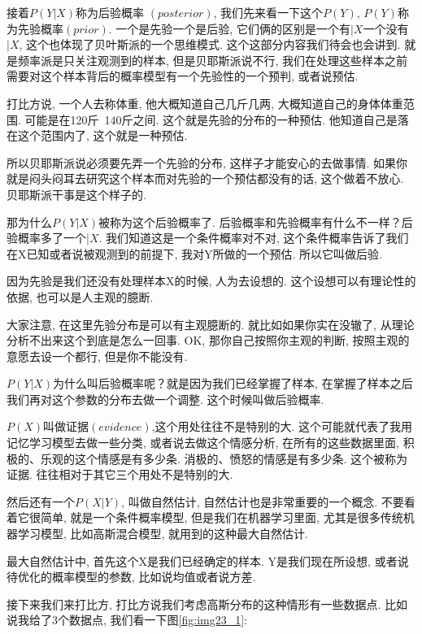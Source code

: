 接着$P(Y|X)$称为后验概率 $(\mathord{posterior})$, 我们先来看一下这个$P(Y)$, $P(Y)$称为先验概率$(\mathord{prior})$. 一个是先验一个是后验, 它们俩的区别是一个有$|X$一个没有$|X$, 这个也体现了贝叶斯派的一个思维模式. 这个这部分内容我们待会也会讲到. 就是频率派是只关注观测到的样本, 但是贝耶斯派说不行, 我们在处理这些样本之前需要对这个样本背后的概率模型有一个先验性的一个预判, 或者说预估. 

打比方说, 一个人去称体重, 他大概知道自己几斤几两, 大概知道自己的身体体重范围. 可能是在120斤~140斤之间. 这个就是先验的分布的一种预估. 他知道自己是落在这个范围内了, 这个就是一种预估. 

所以贝耶斯派说必须要先弄一个先验的分布, 这样子才能安心的去做事情. 如果你就是闷头闷耳去研究这个样本而对先验的一个预估都没有的话, 这个做着不放心. 贝耶斯派干事是这个样子的. 

那为什么$P(Y|X)$被称为这个后验概率了. 后验概率和先验概率有什么不一样？后验概率多了一个$|X$. 我们知道这是一个条件概率对不对, 这个条件概率告诉了我们在X已知或者说被观测到的前提下, 我对Y所做的一个预估. 所以它叫做后验. 

因为先验是我们还没有处理样本X的时候, 人为去设想的. 这个设想可以有理论性的依据, 也可以是人主观的臆断. 

大家注意, 在这里先验分布是可以有主观臆断的. 就比如如果你实在没辙了, 从理论分析不出来这个到底是怎么一回事. OK, 那你自己按照你主观的判断, 按照主观的意愿去设一个都行, 但是你不能没有. 

$P(Y|X)$为什么叫后验概率呢？就是因为我们已经掌握了样本, 在掌握了样本之后
我们再对这个参数的分布去做一个调整. 这个时候叫做后验概率. 

$P(X)$叫做证据$(\mathord{evidence})$,这个用处往往不是特别的大. 这个可能就代表了我用记忆学习模型去做一些分类, 或者说去做这个情感分析, 在所有的这些数据里面, 积极的、乐观的这个情感是有多少条. 消极的、愤怒的情感是有多少条. 这个被称为证据. 往往相对于其它三个用处不是特别的大. 

然后还有一个$P(X|Y)$, 叫做自然估计, 自然估计也是非常重要的一个概念. 不要看着它很简单, 就是一个条件概率模型, 但是我们在机器学习里面, 尤其是很多传统机器学习模型, 比如高斯混合模型, 就用到的这种最大自然估计. 

最大自然估计中, 首先这个X是我们已经确定的样本. Y是我们现在所设想, 或者说待优化的概率模型的参数, 比如说均值或者说方差. 

接下来我们来打比方, 打比方说我们考虑高斯分布的这种情形有一些数据点. 比如说我给了3个数据点, 我们看一下图\ref{fig:img23_1}: 

